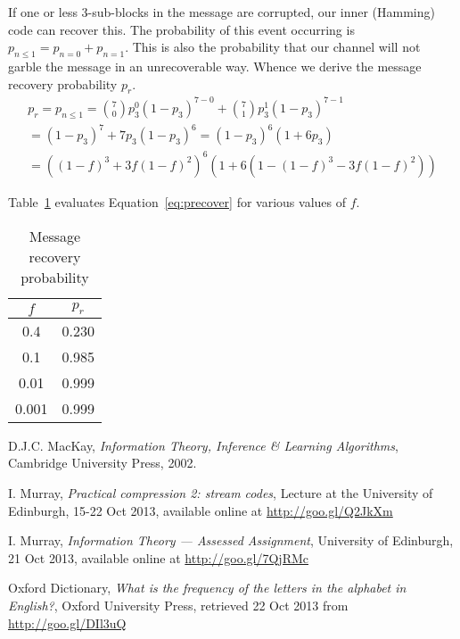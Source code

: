 \documentclass[10pt,a4paper,oneside,onecolumn]{article}
\begin{document}
If one or less 3-sub-blocks in the message are corrupted, our inner (Hamming)
code can recover this. The probability of this event occurring is $p_{n \leq 1} =
p_{n=0} + p_{n=1}$. This is also the probability that our channel will not
garble the message in an unrecoverable way. Whence we derive the message
recovery probability $p_r$.
\begin{equation}\label{eq:precover}
\begin{split}
p_r = p_{n \leq 1} =
{7 \choose 0} p_3^0(1-p_3)^{7-0} + {7 \choose 1} p_3^1(1-p_3)^{7-1} \\
= (1-p_3)^7 + 7p_3(1-p_3)^6 = (1-p_3)^6(1+6p_3) \\
= ((1-f)^3+3f(1-f)^2)^6(1+6(1 - (1-f)^3 - 3f(1-f)^2))
\end{split}
\end{equation}

Table~\ref{tbl:precover} evaluates Equation~\eqref{eq:precover} for various
values of $f$.

\begin{table}[ht]
\centering
\begin{tabular}{| c | c |}
\hline
$f$ & $p_r$ \\
\hline
0.4   & 0.230 \\
0.1   & 0.985 \\
0.01  & 0.999 \\
0.001 & 0.999 \\
\hline
\end{tabular}
\caption{Message recovery probability}
\label{tbl:precover}
\end{table}


\begin{thebibliography}{9}

    D.J.C. MacKay,
    \emph{Information Theory, Inference \& Learning Algorithms},
    Cambridge University Press,
    2002.

    I. Murray,
    \emph{Practical compression 2: stream codes},
    Lecture at the University of Edinburgh,
    15-22 Oct 2013,
    available online at \url{http://goo.gl/Q2JkXm}

    I. Murray,
    \emph{Information Theory — Assessed Assignment},
    University of Edinburgh,
    21 Oct 2013,
    available online at \url{http://goo.gl/7QjRMc}

    Oxford Dictionary,
    \emph{What is the frequency of the letters in the alphabet in English?},
    Oxford University Press,
    retrieved 22 Oct 2013 from \url{http://goo.gl/DIl3uQ}

\end{thebibliography}
\end{document}
